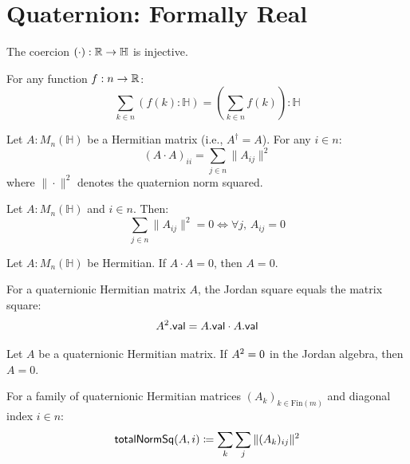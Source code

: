 \section{Quaternion: Formally Real}

\begin{theorem}
The coercion $(\cdot) : \mathbb{R} \to \mathbb{H}$ is injective.
\end{theorem}

\begin{lemma}
For any function $f : n \to \mathbb{R}$:
\[ \sum_{k \in n} (f(k) : \mathbb{H}) = \left(\sum_{k \in n} f(k)\right) : \mathbb{H} \]
\end{lemma}

\begin{theorem}
Let $A : M_n(\mathbb{H})$ be a Hermitian matrix (i.e., $A^\dagger = A$). For any $i \in n$:
\[ (A \cdot A)_{ii} = \sum_{j \in n} \|A_{ij}\|^2 \]
where $\|\cdot\|^2$ denotes the quaternion norm squared.
\end{theorem}

\begin{theorem}
Let $A : M_n(\mathbb{H})$ and $i \in n$. Then:
\[ \sum_{j \in n} \|A_{ij}\|^2 = 0 \iff \forall j,\, A_{ij} = 0 \]
\end{theorem}

\begin{theorem}
Let $A : M_n(\mathbb{H})$ be Hermitian. If $A \cdot A = 0$, then $A = 0$.
\end{theorem}

\begin{theorem}
For a quaternionic Hermitian matrix $A$, the Jordan square equals the matrix square:
\[ A^{2}.\mathsf{val} = A.\mathsf{val} \cdot A.\mathsf{val} \]
\end{theorem}

\begin{theorem}
Let $A$ be a quaternionic Hermitian matrix. If $A^{2} = 0$ in the Jordan algebra, then $A = 0$.
\end{theorem}

\begin{definition}[totalNormSq]
For a family of quaternionic Hermitian matrices $(A_k)_{k \in \mathrm{Fin}(m)}$ and diagonal index $i \in n$:
\[ \mathsf{totalNormSq}(A, i) \coloneqq \sum_{k} \sum_{j} \|(A_k)_{ij}\|^2 \]
\end{definition}

